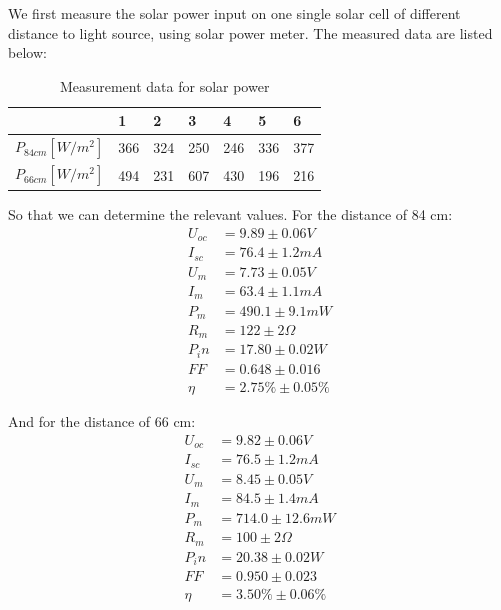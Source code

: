 \documentclass[12pt, a4paper]{article}
\begin{document}
We first measure the solar power input on one single solar cell of different distance to light source, using solar power meter.
The measured data are listed below:
\begin{table}[H]
	\begin{center}
	\begin{tabular}{|l|l|l|l|l|l|l|}
	\hline
					   & 1   & 2   & 3   & 4   & 5   & 6   \\ \hline
	$P_{84cm} [W/m^2]$ & 366 & 324 & 250 & 246 & 336 & 377 \\ \hline
	$P_{66cm} [W/m^2]$ & 494 & 231 & 607 & 430 & 196 & 216 \\ \hline
	\end{tabular}
	\caption{Measurement data for solar power}
	\end{center}
\end{table}

So that we can determine the relevant values. For the distance of 84 cm:
\begin{align*}
	U_{oc} &= 9.89 \pm 0.06 V\\
	I_{sc} &= 76.4 \pm 1.2 mA\\
	U_m &= 7.73 \pm 0.05 V\\
	I_m &= 63.4 \pm 1.1 mA\\
	P_m &= 490.1 \pm 9.1 mW\\
	R_m &= 122 \pm 2 \Omega \\
	P_in &= 17.80 \pm 0.02W \\
	FF &= 0.648 \pm 0.016 \\
	\eta &= 2.75 \% \pm 0.05\%
\end{align*}

And for the distance of 66 cm:
\begin{align*}
	U_{oc} &= 9.82 \pm 0.06 V\\
	I_{sc} &= 76.5 \pm 1.2 mA \\
	U_m &= 8.45 \pm 0.05 V \\
	I_m &= 84.5 \pm 1.4 mA\\
	P_m &= 714.0 \pm 12.6 mW\\
	R_m &= 100 \pm 2 \Omega \\
	P_in &= 20.38 \pm 0.02W\\ 
	FF &= 0.950 \pm 0.023\\
	\eta &= 3.50\% \pm 0.06\%
\end{align*}
\end{document}
